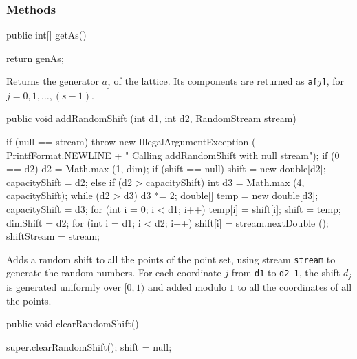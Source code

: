 \subsubsection*{Methods}
\begin{code}

   public int[] getAs() \begin{hide} {
      return genAs;
   }\end{hide}
\end{code}
\begin{tabb}
Returns the generator $a_j$ of the lattice. Its components
  are returned as \texttt{a[$j$]}, for $j = 0, 1, \ldots, (s-1)$.
\end{tabb}
\begin{code}

   public void addRandomShift (int d1, int d2, RandomStream stream) \begin{hide} {
      if (null == stream)
         throw new IllegalArgumentException (
              PrintfFormat.NEWLINE +
                  "   Calling addRandomShift with null stream");
      if (0 == d2)
         d2 = Math.max (1, dim);
      if (shift == null) {
         shift = new double[d2];
         capacityShift = d2;
      } else if (d2 > capacityShift) {
         int d3 = Math.max (4, capacityShift);
         while (d2 > d3)
            d3 *= 2;
         double[] temp = new double[d3];
         capacityShift = d3;
         for (int i = 0; i < d1; i++)
            temp[i] = shift[i];
         shift = temp;
      }
      dimShift = d2;
      for (int i = d1; i < d2; i++)
         shift[i] = stream.nextDouble ();
      shiftStream = stream;
   }\end{hide}
\end{code}
\begin{tabb}  Adds a random shift to all the points of the point set,
  using stream \texttt{stream} to generate the random numbers.
  For each coordinate $j$ from \texttt{d1} to \texttt{d2-1},
  the shift $d_{j}$ is generated uniformly over $[0, 1)$ and added modulo $1$ to
  all the coordinates of all the points.
\end{tabb}
\begin{htmlonly}
\end{htmlonly}
\begin{code}

   public void clearRandomShift() \begin{hide} {
      super.clearRandomShift();
      shift = null;
   }\end{hide}
\end{code}
